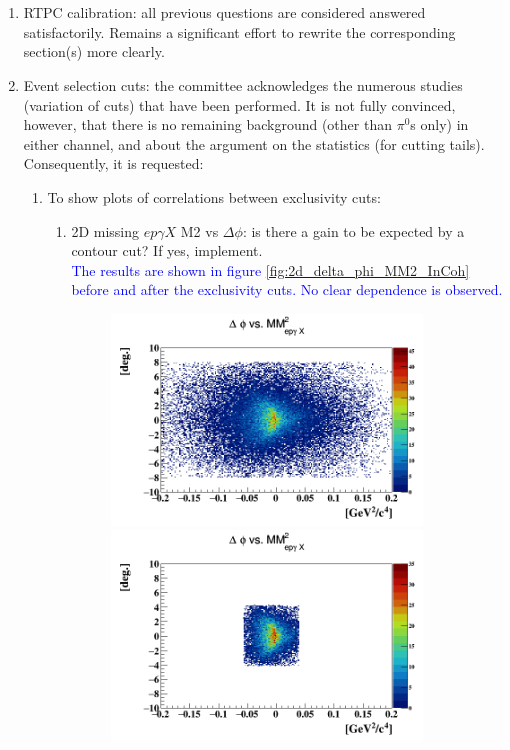 \section*{}

\begin{enumerate}
\item RTPC calibration: all previous questions are considered answered 
satisfactorily. Remains a significant effort to rewrite the corresponding 
section(s) more clearly.

\item Event selection cuts: the committee acknowledges the numerous studies 
(variation of cuts) that have been performed. It is not fully convinced, 
however, that there is no remaining background (other than $\pi^{0}$s only) in 
either channel, and about the argument on the statistics (for cutting tails).  
Consequently, it is requested:
\begin{enumerate}
\item To show plots of correlations between exclusivity cuts:
\begin{enumerate}
  \item 2D missing $ep\gamma X$ M2 vs $\Delta \phi$: is there a gain to be 
     expected by a contour cut? If yes, implement.\\
    \textcolor{blue}{The results are shown in figure 
       \ref{fig:2d_delta_phi_MM2_InCoh} before and after the exclusivity cuts.  
    No clear dependence is observed.} 
    \begin{figure}[!h]
    \includegraphics[height=5.6cm]{fig/delta_phi_epgamma_M2_Mis.png}
    \includegraphics[height=5.6cm]{fig/delta_phi_epgamma_M2_Mis_with.png}

\end{figure}
\end{enumerate}
\end{enumerate}
\end{enumerate}
